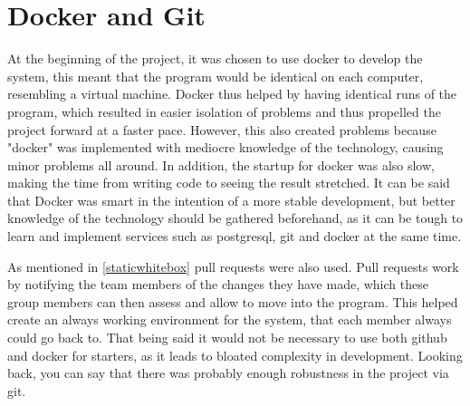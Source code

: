 \section{Docker and Git}
At the beginning of the project, it was chosen to use docker to develop the system, this meant that the program would be identical on each computer, resembling a virtual machine.
Docker thus helped by having identical runs of the program, which resulted in easier isolation of problems and thus propelled the project forward at a faster pace.
However, this also created problems because "docker" was implemented with mediocre knowledge of the technology, causing minor problems all around.
In addition, the startup for docker was also slow, making the time from writing code to seeing the result stretched.
It can be said that Docker was smart in the intention of a more stable development, but better knowledge of the technology should be gathered beforehand, as it can be tough to learn and implement services such as postgresql, git and docker at the same time.

As mentioned in \cref{staticwhitebox} pull requests were also used. Pull requests work by notifying the team members of the changes they have made, which these group members can then assess and allow to move into the program. This helped create an always working environment for the system, that each member always could go back to.
That being said it would not be necessary to use both github and docker for starters, as it leads to bloated complexity in development. 
Looking back, you can say that there was probably enough robustness in the project via git.
